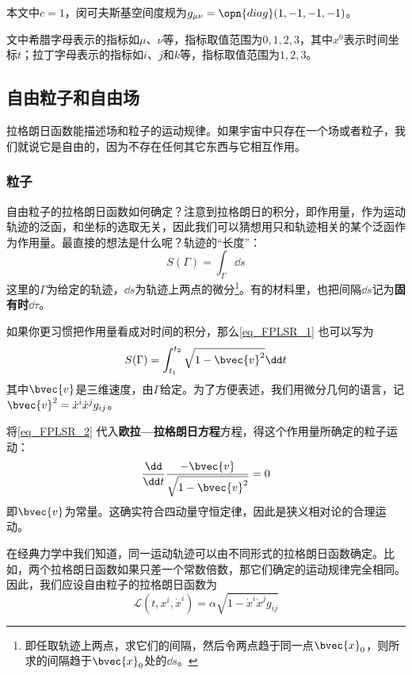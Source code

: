 

本文中$c=1$，闵可夫斯基空间度规为$g_{\mu\nu} = \opn{diag}(1, -1, -1, -1)$。

文中希腊字母表示的指标如$\mu$、$\nu$等，指标取值范围为$0, 1, 2, 3$，其中$x^0$表示时间坐标$t$；拉丁字母表示的指标如$i$、$j$和$k$等，指标取值范围为$1, 2, 3$。

\subsection{自由粒子和自由场}

拉格朗日函数能描述场和粒子的运动规律。如果宇宙中只存在一个场或者粒子，我们就说它是自由的，因为不存在任何其它东西与它相互作用。

\subsubsection{粒子}

自由粒子的拉格朗日函数如何确定？注意到拉格朗日的积分，即作用量，作为运动轨迹的泛函，和坐标的选取无关，因此我们可以猜想用只和轨迹相关的某个泛函作为作用量。最直接的想法是什么呢？轨迹的“长度”：
\begin{equation}\label{eq_FPLSR_1}
S(\Gamma) = \int_\Gamma \dd s
\end{equation}
这里的$\Gamma$为给定的轨迹，$\dd s$为轨迹上两点的微分\footnote{即任取轨迹上两点，求它们的间隔，然后令两点趋于同一点$\bvec{x}_0$，则所求的间隔趋于$\bvec{x}_0$处的$\dd s$。}。有的材料里，也把间隔$\dd s$记为\textbf{固有时}$\dd \tau$。

如果你更习惯把作用量看成对时间的积分，那么\autoref{eq_FPLSR_1} 也可以写为
\begin{equation}\label{eq_FPLSR_2}
S(\Gamma) = \int_{t_1}^{t_2} \sqrt{1-\bvec{v}^2} \dd t
\end{equation}
其中$\bvec{v}$是三维速度，由$\Gamma$给定。为了方便表述，我们用微分几何的语言，记$\bvec{v}^2=\dot{x}^i\dot{x}^jg_{ij}$。

将\autoref{eq_FPLSR_2} 代入\textbf{欧拉—拉格朗日方程}方程，得这个作用量所确定的粒子运动：
\begin{equation}
\frac{\dd}{\dd t}\frac{-\bvec{v}}{\sqrt{1-\bvec{v}^2}} = 0
\end{equation}
即$\bvec{v}$为常量。这确实符合四动量守恒定律，因此是狭义相对论的合理运动。

在经典力学中我们知道，同一运动轨迹可以由不同形式的拉格朗日函数确定。比如，两个拉格朗日函数如果只差一个常数倍数，那它们确定的运动规律完全相同。因此，我们应设自由粒子的拉格朗日函数为
\begin{equation}
\mathcal{L}(t, x^i, \dot{x}^i) = \alpha\sqrt{1-\dot{x}^i\dot{x}^jg_{ij}}
\end{equation}

